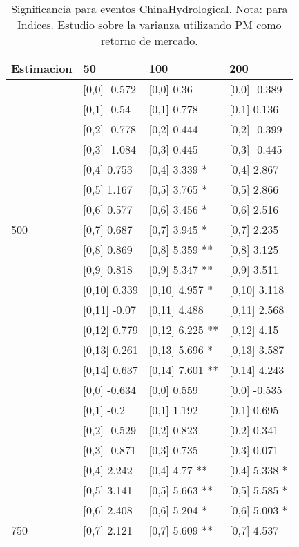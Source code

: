 \begin{table}

\caption{Significancia para eventos ChinaHydrological. Nota: para Indices. Estudio sobre la varianza utilizando PM como retorno de mercado.}
\centering
\begin{tabular}[t]{llll}
\toprule
Estimacion & 50 & 100 & 200\\
\midrule
 & {}[0,0] -0.572 & {}[0,0] 0.36 & {}[0,0] -0.389\\
 & {}[0,1] -0.54 & {}[0,1] 0.778 & {}[0,1] 0.136\\
 & {}[0,2] -0.778 & {}[0,2] 0.444 & {}[0,2] -0.399\\
 & {}[0,3] -1.084 & {}[0,3] 0.445 & {}[0,3] -0.445\\
 & {}[0,4] 0.753 & {}[0,4] 3.339 * & {}[0,4] 2.867\\
\addlinespace
 & {}[0,5] 1.167 & {}[0,5] 3.765 * & {}[0,5] 2.866\\
 & {}[0,6] 0.577 & {}[0,6] 3.456 * & {}[0,6] 2.516\\
500 & {}[0,7] 0.687 & {}[0,7] 3.945 * & {}[0,7] 2.235\\
 & {}[0,8] 0.869 & {}[0,8] 5.359 ** & {}[0,8] 3.125\\
 & {}[0,9] 0.818 & {}[0,9] 5.347 ** & {}[0,9] 3.511\\
\addlinespace
 & {}[0,10] 0.339 & {}[0,10] 4.957 * & {}[0,10] 3.118\\
 & {}[0,11] -0.07 & {}[0,11] 4.488 & {}[0,11] 2.568\\
 & {}[0,12] 0.779 & {}[0,12] 6.225 ** & {}[0,12] 4.15\\
 & {}[0,13] 0.261 & {}[0,13] 5.696 * & {}[0,13] 3.587\\
 & {}[0,14] 0.637 & {}[0,14] 7.601 ** & {}[0,14] 4.243\\
\addlinespace
 & {}[0,0] -0.634 & {}[0,0] 0.559 & {}[0,0] -0.535\\
 & {}[0,1] -0.2 & {}[0,1] 1.192 & {}[0,1] 0.695\\
 & {}[0,2] -0.529 & {}[0,2] 0.823 & {}[0,2] 0.341\\
 & {}[0,3] -0.871 & {}[0,3] 0.735 & {}[0,3] 0.071\\
 & {}[0,4] 2.242 & {}[0,4] 4.77 ** & {}[0,4] 5.338 *\\
\addlinespace
 & {}[0,5] 3.141 & {}[0,5] 5.663 ** & {}[0,5] 5.585 *\\
 & {}[0,6] 2.408 & {}[0,6] 5.204 * & {}[0,6] 5.003 *\\
750 & {}[0,7] 2.121 & {}[0,7] 5.609 ** & {}[0,7] 4.537\\

\end{tabular}
\end{table}
